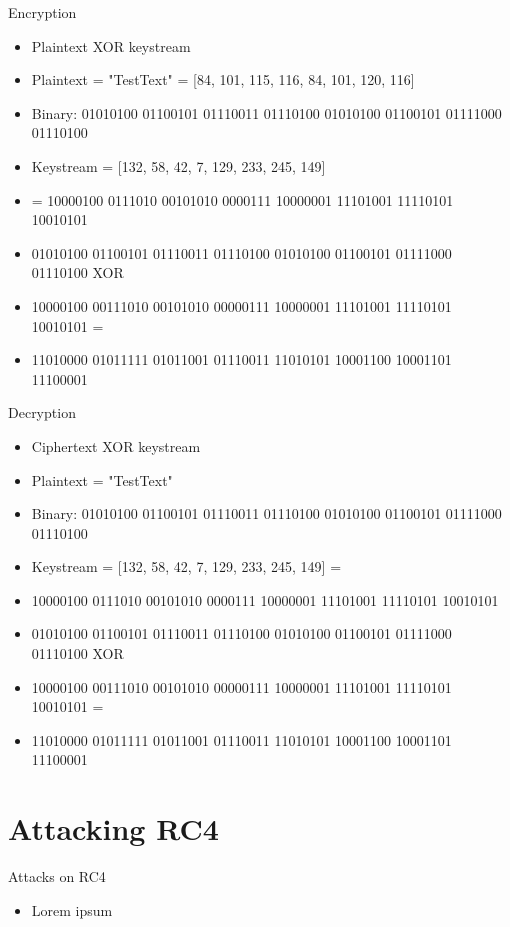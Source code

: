 \documentclass[
	aspectratio=169,	%
	onlytextwidth,		%
	t,					%
	]{beamer}
\begin{document}
\begin{frame}[fragile]{Encryption}
	\small
	\begin{itemize}
		\item Plaintext XOR keystream
		\item Plaintext = "TestText" = [84, 101, 115, 116, 84, 101, 120, 116]
		\item Binary: 01010100 01100101 01110011 01110100 01010100 01100101 01111000 01110100
		\item Keystream = [132, 58, 42, 7, 129, 233, 245, 149]
		\item = 10000100 0111010 00101010 0000111 10000001 11101001 11110101 10010101
		\item 01010100 01100101 01110011 01110100 01010100 01100101 01111000 01110100 XOR
		\item 10000100 00111010 00101010 00000111 10000001 11101001 11110101 10010101 = 
		\item 11010000 01011111 01011001 01110011 11010101 10001100 10001101 11100001
	\end{itemize}
	\normalsize
\end{frame}

\begin{frame}[fragile]{Decryption}
	\small
	\begin{itemize}
		\item Ciphertext XOR keystream
		\item Plaintext = "TestText"
		\item Binary: 01010100 01100101 01110011 01110100 01010100 01100101 01111000 01110100
		\item Keystream = [132, 58, 42, 7, 129, 233, 245, 149] =
		\item 10000100 0111010 00101010 0000111 10000001 11101001 11110101 10010101
		\item 01010100 01100101 01110011 01110100 01010100 01100101 01111000 01110100 XOR
		\item 10000100 00111010 00101010 00000111 10000001 11101001 11110101 10010101 = 
		\item 11010000 01011111 01011001 01110011 11010101 10001100 10001101 11100001
	\end{itemize}
	\normalsize
\end{frame}

\section{Attacking RC4}

\begin{frame}[fragile]{Attacks on RC4}
	\begin{itemize}
		\item Lorem ipsum
	\end{itemize}
\end{frame}
\end{document}
